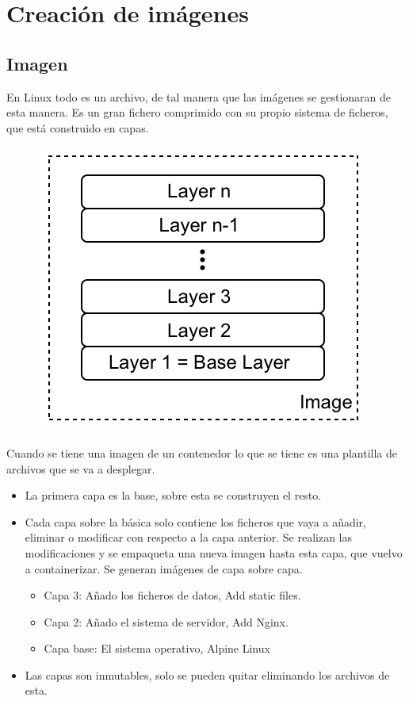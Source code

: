 \documentclass[12pt, twoside, openright]{report} %
\begin{document}
\section{Creación de imágenes}
\subsection{Imagen}
En Linux todo es un archivo, de tal manera que las imágenes se gestionaran de esta manera. Es un gran fichero comprimido con su propio sistema de ficheros, que está construido en capas.

\begin{figure}[H]
	{\includegraphics[scale=.5]{c4c5fd21-cc6e-49e6-b4f8-1692a5f1a561.jpg}}
\end{figure}
Cuando se tiene una imagen de un contenedor lo que se tiene es una plantilla de archivos que se va a desplegar.
\begin{itemize}
	\item La primera capa es la base, sobre esta se construyen el resto.
	\item Cada capa sobre la básica solo contiene los ficheros que vaya a añadir, eliminar o modificar con respecto a la capa anterior.
	      Se realizan las modificaciones y se empaqueta una nueva imagen hasta esta capa, que vuelvo a containerizar. Se generan imágenes de capa sobre capa.
	      \begin{itemize}
		      \item Capa 3: Añado los ficheros de datos, Add static files.
		      \item Capa 2: Añado el sistema de servidor, Add Nginx.
		      \item Capa base: El sistema operativo, Alpine Linux
	      \end{itemize}
	\item Las capas son inmutables, solo se pueden quitar eliminando los archivos de esta.
\end{itemize}
\end{document}
